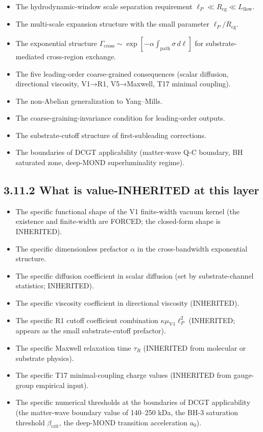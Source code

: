\documentclass[11pt]{book}
\begin{document}
\begin{itemize}
\item The hydrodynamic-window scale separation requirement $\ell_P \ll R_\mathrm{cg} \ll L_\mathrm{flow}$.
\item The multi-scale expansion structure with the small parameter $\ell_P/R_\mathrm{cg}$.
\item The exponential structure $\Gamma_\mathrm{cross} \sim \exp[-\alpha\int_\mathrm{path}\sigma\,d\ell]$ for substrate-mediated cross-region exchange.
\item The five leading-order coarse-grained consequences (scalar diffusion, directional viscosity, V1→R1, V5→Maxwell, T17 minimal coupling).
\item The non-Abelian generalization to Yang–Mills.
\item The coarse-graining-invariance condition for leading-order outputs.
\item The substrate-cutoff structure of first-subleading corrections.
\item The boundaries of DCGT applicability (matter-wave Q-C boundary, BH saturated zone, deep-MOND superluminality regime).
\end{itemize}

\subsection{3.11.2 What is value-INHERITED at this layer}

\begin{itemize}
\item The specific functional shape of the V1 finite-width vacuum kernel (the existence and finite-width are FORCED; the closed-form shape is INHERITED).
\item The specific dimensionless prefactor $\alpha$ in the cross-bandwidth exponential structure.
\item The specific diffusion coefficient in scalar diffusion (set by substrate-channel statistics; INHERITED).
\item The specific viscosity coefficient in directional viscosity (INHERITED).
\item The specific R1 cutoff coefficient combination $\kappa\mu_\mathrm{V1}\ell_P^2$ (INHERITED; appears as the small substrate-cutoff prefactor).
\item The specific Maxwell relaxation time $\tau_R$ (INHERITED from molecular or substrate physics).
\item The specific T17 minimal-coupling charge values (INHERITED from gauge-group empirical input).
\item The specific numerical thresholds at the boundaries of DCGT applicability (the matter-wave boundary value of 140–250 kDa, the BH-3 saturation threshold $\beta_\mathrm{crit}$, the deep-MOND transition acceleration $a_0$).
\end{itemize}
\end{document}
